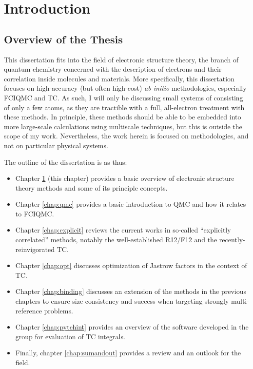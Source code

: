 \chapter{Introduction}
  \label{chap:intro}


\section{Overview of the Thesis}

This dissertation fits into the field of electronic structure theory, the branch of quantum chemistry concerned with the description of electrons and their correlation inside molecules and materials. More specifically, this dissertation focuses on high-accuracy (but often high-cost) \emph{ab initio} methodologies, especially \gls{FCIQMC} and \gls{TC}. As such, I will only be discussing small systems of consisting of only a few atoms, as they are tractible with a full, all-electron treatment with these methods. In principle, these methods should be able to be embedded  into more large-scale calculations using multiscale techniques, but this is outside the scope of my work. Nevertheless, the work herein is focused on methodologies, and not on particular physical systems.

The outline of the dissertation is as thus:
\begin{itemize}
    \item Chapter \ref{chap:intro} (this chapter) provides a basic overview of electronic structure theory methods and some of its principle concepts.
    \item Chapter \ref{chap:qmc} provides a basic introduction to \gls{QMC} and how it relates to \gls{FCIQMC}.
    \item Chapter \ref{chap:explicit} reviews the current works in so-called ``explicitly correlated'' methods, notably the well-established R12/F12 and the recently-reinvigorated \gls{TC}.
    \item Chapter \ref{chap:opt} discusses optimization of Jastrow factors in the context of \gls{TC}.
    \item Chapter \ref{chap:binding} discusses an extension of the methods in the previous chapters to ensure size consistency and success when targeting strongly multi-reference problems.
    \item Chapter \ref{chap:pytchint} provides an overview of the software \pytchint developed in the group for evaluation of \gls{TC} integrals.
    \item Finally, chapter \ref{chap:sumandout} provides a review and an outlook for the field.
\end{itemize}

